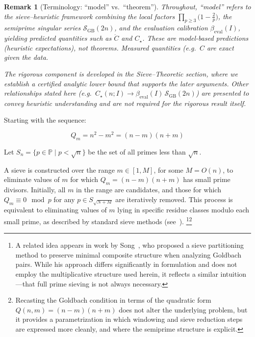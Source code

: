 \documentclass[11pt]{article}
\theoremstyle{inline}
\newtheorem*{remark}{Remark}
\theoremstyle{break}
\theoremstyle{break}
\theoremstyle{break}
\theoremstyle{break}
\theoremstyle{break}
\theoremstyle{break}
\theoremstyle{break}
\theoremstyle{inline}
\newcommand{\Cmeas}{C}              %
\newcommand{\Cpred}{\mathring{C}}   %
\newcommand{\SGB}{\mathcal{S}_{\scriptscriptstyle\mathrm{GB}}}
\newcommand{\betacal}{\beta_{\mathrm{eval}}}
\begin{document}
\begin{remark}[Terminology: ``model'' vs.\ ``theorem'']
Throughout, ``model'' refers to the sieve–heuristic framework combining the local
factors \( \prod_{p\ge3}\!\bigl(1-\tfrac{2}{p}\bigr) \), the semiprime singular series
\( \SGB(2n) \), and the evaluation calibration \( \betacal(I) \), yielding
predicted quantities such as \( \Cpred \) and \( C_\star \). These are
\emph{model-based predictions} (heuristic expectations), not theorems.
Measured quantities (e.g.\ \( \Cmeas \) are exact given the data.

The rigorous component is developed in the Sieve–Theoretic section, where we 
establish a certified analytic lower bound that supports the later arguments.
Other relationships stated here (e.g.\ \( C_\star(n;I)\to \betacal(I)\,\SGB(2n) \))
are presented to convey heuristic understanding and are not required
for the rigorous result itself.
\end{remark}
Starting with the sequence:

\begin{equation}
Q_m = n^2 - m^2 = (n - m)(n + m)
\end{equation}

Let \( S_n = \{ p \in \mathbb{P} \mid p < \sqrt{n} \} \) be the set of all primes less than \( \sqrt{n} \).

A sieve is constructed over the range \( m \in [1, M] \), for some \( M = O(n) \), to eliminate values of \( m \) for which \( Q_m = (n - m)(n + m) \) has small prime divisors. Initially, all \( m \) in the range are candidates, and those for which \( Q_m \equiv 0 \mod p \) for any \( p \in S_{\sqrt{N+M}} \) are iteratively removed. This process is equivalent to eliminating values of \( m \) lying in specific residue classes modulo each small prime, as described by standard sieve methods (see~\cite{HalberstamRichert1974,IwaniecKowalski2004,FriedlanderIwaniec2010}).  \footnote{A related idea appears in work by Song~\cite{Song2008}, who proposed a sieve partitioning method to preserve minimal composite structure when analyzing Goldbach pairs. While his approach differs significantly in formulation and does not employ the multiplicative structure used herein, it reflects a similar intuition---that full prime sieving is not always necessary.}\footnote{Recasting the Goldbach condition in terms of the quadratic form \(Q(n,m)=(n-m)(n+m)\) does not alter the underlying problem, but it provides a parametrization in which windowing and sieve reduction steps are expressed more cleanly, and where the semiprime structure is explicit.}
\end{document}

